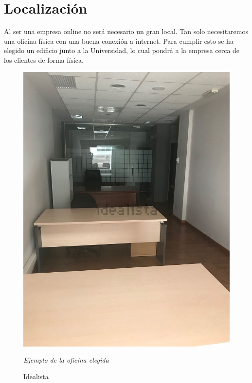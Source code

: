 \documentclass[openany,overnay,a4paper, twoside, 12pt]{book}
\begin{document}
\section{Localización} 
%
%
%
%
%
Al ser una empresa online no será necesario un gran local. Tan solo necesitaremos una oficina física con una buena conexión a internet. Para cumplir esto se ha elegido un edificio junto a la Universidad, lo cual pondrá a la empresa cerca de los clientes de forma física.\\
\begin{figure}[h]
\centering


\includegraphics[scale = 0.2]{imagenes/oficina.jpg}
\renewcommand{\figurename}{Imagen}
\renewcommand{\thefigure}{}
\caption{\textit{Ejemplo de la oficina elegida}}
\renewcommand{\figurename}{Fuente}
\caption{Idealista}
\end{figure}
\\
\end{document}
